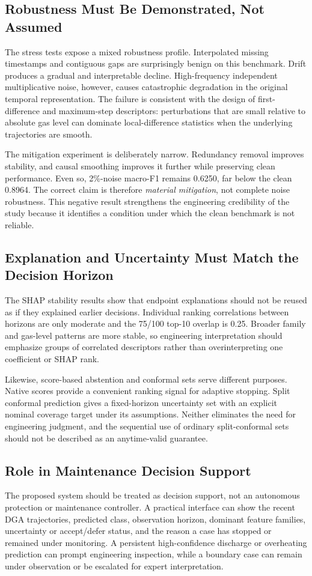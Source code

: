 \documentclass[conference]{IEEEtran}
\begin{document}
\subsection{Robustness Must Be Demonstrated, Not Assumed}
The stress tests expose a mixed robustness profile. Interpolated missing timestamps and contiguous gaps are surprisingly benign on this benchmark. Drift produces a gradual and interpretable decline. High-frequency independent multiplicative noise, however, causes catastrophic degradation in the original temporal representation. The failure is consistent with the design of first-difference and maximum-step descriptors: perturbations that are small relative to absolute gas level can dominate local-difference statistics when the underlying trajectories are smooth.

The mitigation experiment is deliberately narrow. Redundancy removal improves stability, and causal smoothing improves it further while preserving clean performance. Even so, 2\%-noise macro-F1 remains 0.6250, far below the clean 0.8964. The correct claim is therefore \emph{material mitigation}, not complete noise robustness. This negative result strengthens the engineering credibility of the study because it identifies a condition under which the clean benchmark is not reliable.

\subsection{Explanation and Uncertainty Must Match the Decision Horizon}
The SHAP stability results show that endpoint explanations should not be reused as if they explained earlier decisions. Individual ranking correlations between horizons are only moderate and the 75/100 top-10 overlap is 0.25. Broader family and gas-level patterns are more stable, so engineering interpretation should emphasize groups of correlated descriptors rather than overinterpreting one coefficient or SHAP rank.

Likewise, score-based abstention and conformal sets serve different purposes. Native scores provide a convenient ranking signal for adaptive stopping. Split conformal prediction gives a fixed-horizon uncertainty set with an explicit nominal coverage target under its assumptions. Neither eliminates the need for engineering judgment, and the sequential use of ordinary split-conformal sets should not be described as an anytime-valid guarantee.

\subsection{Role in Maintenance Decision Support}
The proposed system should be treated as decision support, not an autonomous protection or maintenance controller. A practical interface can show the recent DGA trajectories, predicted class, observation horizon, dominant feature families, uncertainty or accept/defer status, and the reason a case has stopped or remained under monitoring. A persistent high-confidence discharge or overheating prediction can prompt engineering inspection, while a boundary case can remain under observation or be escalated for expert interpretation.
\end{document}
